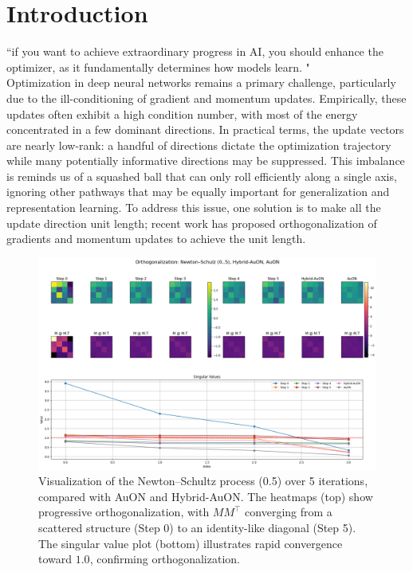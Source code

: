 \documentclass[12pt,a4paper]{article}
\begin{document}
\section{Introduction}
       “if you want to achieve extraordinary progress in AI, you should enhance the optimizer, as it fundamentally determines how models learn. "\\
Optimization in deep neural networks remains a primary challenge, particularly due to the ill-conditioning of gradient and momentum updates. Empirically, these updates often exhibit a high condition number, with most of the energy concentrated in a few dominant directions. In practical terms, the update vectors are nearly low-rank: a handful of directions dictate the optimization trajectory while many potentially informative directions may be suppressed. This imbalance is reminds us of a squashed ball that can only roll efficiently along a single axis, ignoring other pathways that may be equally important for generalization and representation learning. To address this issue, one solution is to 
make all the update direction unit length; recent work has proposed orthogonalization of gradients and momentum updates to achieve the unit length.
\begin{figure}[!htb]
    \vspace*{\fill}
    \centering
    \includegraphics[width=1.0\linewidth]{all2.png}
   \caption{Visualization of the Newton–Schultz process (0.5) over 5 iterations, compared with AuON and Hybrid-AuON. 
The heatmaps (top) show progressive orthogonalization, with $M M^\top$ converging from a scattered structure (Step 0) to an identity-like diagonal (Step 5). 
The singular value plot (bottom) illustrates rapid convergence toward $1.0$, confirming orthogonalization.}
    \label{fig:training_curves}
    \vspace*{\fill}
\end{figure}
\end{document}
